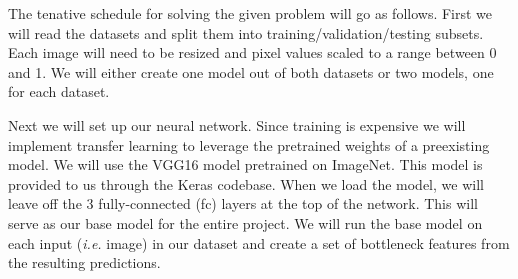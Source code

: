 \documentclass[10pt, a4paper, twocolumn]{article} %
\begin{document}

The tenative schedule for solving the given problem will go as follows. First we will read the datasets and split them into training/validation/testing subsets.  Each image will need to be resized and pixel values scaled to a range between 0 and 1. We will either create one model out of both datasets or two models, one for each dataset.

Next we will set up our neural network. Since training is expensive we will implement transfer learning to leverage the pretrained weights of a preexisting model.  We will use the VGG16 model pretrained on ImageNet.  This model is provided to us through the Keras codebase.  When we load the model, we will leave off the 3 fully-connected (fc) layers at the top of the network.  This will serve as our base model for the entire project.  We will run the base model on each input (\textit{i.e.} image) in our dataset and create a set of bottleneck features from the resulting predictions.
\end{document}
